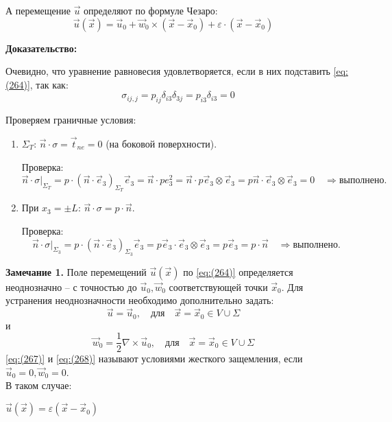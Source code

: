 А перемещение \( \vec{u} \) определяют по формуле Чезаро:
\begin{equation}
\vec{u}(\vec{x}) = \vec{u}_0 + \vec{w}_0 \times (\vec{x} - \vec{x}_0) + \varepsilon \cdot (\vec{x} - \vec{x}_0) \quad \label{eq:(266)}
\end{equation}

\textbf{Доказательство:}

Очевидно, что уравнение равновесия удовлетворяется, если в них подставить \ref{eq:(264)}, так как:
\[
\sigma_{ij,j} = p_{ij} \delta_{i3} \delta_{3j} = p_{i3} \delta_{i3} = 0
\]

Проверяем граничные условия:
\begin{enumerate}
    \item  \( \Sigma_T \): \( \vec{n} \cdot \sigma = \vec{t}_{ne} = 0 \) (на боковой поверхности).

Проверка:
\[
\vec{n} \cdot \sigma|_{\Sigma_T} 
= p \cdot (\vec{n} \cdot \vec{e}_3)_{\Sigma_T} \vec{e}_3 
= \vec{n} \cdot p e_3^2
= \vec{n} \cdot p \vec{e}_3 \otimes \vec{e}_3 
= p \vec{n} \cdot \vec{e}_3 \otimes \vec{e}_3 = 0 \quad \Rightarrow \text{выполнено}.
\]
\item При \( x_3 = \pm L \): \( \vec{n} \cdot \sigma = p \cdot \vec{n} \).

Проверка:
\[
\vec{n} \cdot \sigma|_{\Sigma_3} = p \cdot (\vec{n} \cdot \vec{e}_3)_{\Sigma_3} \vec{e}_3 = p \vec{e}_3 \cdot \vec{e}_3 \otimes \vec{e}_3 = p \vec{e}_3 = p \cdot \vec{n} \quad \Rightarrow \text{выполнено}.
\]
\end{enumerate}

\textbf{Замечание 1.} Поле перемещений \( \vec{u}(\vec{x}) \) по \ref{eq:(264)} определяется неоднозначно – с точностью до \( \vec{u}_0, \vec{w}_0 \) соответствующей точки \( \vec{x}_0 \). Для устранения неоднозначности необходимо дополнительно задать:
\begin{equation}
\vec{u} = \vec{u}_0, \quad \text{для} \quad \vec{x} = \vec{x}_0 \in V \cup \Sigma \quad \label{eq:(267)}
\end{equation}
и
\begin{equation}
\vec{w}_0 = \frac{1}{2} \nabla \times \vec{u}_0, \quad \text{для} \quad \vec{x} = \vec{x}_0 \in V \cup \Sigma \quad \label{eq:(268)}
\end{equation}
\ref{eq:(267)} и \ref{eq:(268)} называют условиями жесткого защемления, если \( \vec{u}_0 = 0, \vec{w}_0 = 0 \). \\В таком случае:

$\vec{u}(\vec{x}) = \varepsilon (\vec{x} - \vec{x}_0) \quad \label{eq:(269)}$


